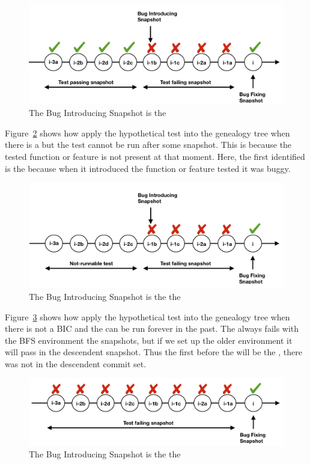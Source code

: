 \documentclass[a4paper, 12pt]{book}
\begin{document}
\begin{figure}[ht]
\centering
\includegraphics[width=\columnwidth]{img/snapshot1.png}
\caption{The Bug Introducing Snapshot is the \BIC}
\label{fig:snapshot1}       %
\end{figure}

Figure~\ref{fig:snapshot2} shows how apply the hypothetical test into the genealogy tree when there is a \BIC but the \TSB test cannot be run after some snapshot. This is because the tested function or feature is not present at that moment. Here, the first \BIS identified is the \BIC because when it introduced the function or feature tested it was buggy.

\begin{figure}[ht]
\centering
\includegraphics[width=\columnwidth]{img/snapshot2.png}
\caption{The Bug Introducing Snapshot is the the \FFC }
\label{fig:snapshot2}       %
\end{figure}

Figure~\ref{fig:snapshot3} shows how apply the hypothetical test into the genealogy tree when there is not a BIC and the \TSB can be run forever in the past. The \TSB always fails with the BFS environment the snapshots, but if we set up the older environment it will pass in the descendent snapshot. Thus the first \BIS before the \BFC will be the \FFC, there was not \BIC in the descendent commit set.
\begin{figure}[ht]
\centering
\includegraphics[width=\columnwidth]{img/snapshot3.png}
\caption{The Bug Introducing Snapshot is the the \FFC }
\label{fig:snapshot3}       %
\end{figure}
\end{document}
